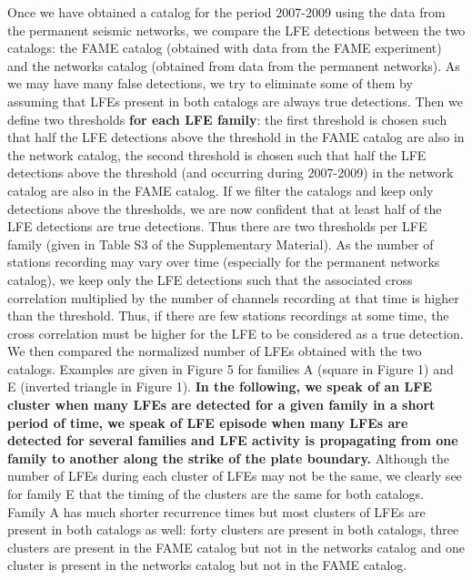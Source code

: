 \documentclass[draft]{agujournal2019}
\begin{document}
Once we have obtained a catalog for the period 2007-2009 using the data from the permanent seismic networks, we compare the LFE detections between the two catalogs: the FAME catalog (obtained with data from the FAME experiment) and the networks catalog (obtained from data from the permanent networks). As we may have many false detections, we try to eliminate some of them by assuming that LFEs present in both catalogs are always true detections. Then we define two thresholds \textbf{for each LFE family}: the first threshold is chosen such that half the LFE detections above the threshold in the FAME catalog are also in the network catalog, the second threshold is chosen such that half the LFE detections above the threshold (and occurring during 2007-2009) in the network catalog are also in the FAME catalog. If we filter the catalogs and keep only detections above the thresholds, we are now confident that at least half of the LFE detections are true detections. Thus there are two thresholds per LFE family (given in Table S3 of the Supplementary Material). As the number of stations recording may vary over time (especially for the permanent networks catalog), we keep only the LFE detections such that the associated cross correlation multiplied by the number of channels recording at that time is higher than the threshold. Thus, if there are few stations recordings at some time, the cross correlation must be higher for the LFE to be considered as a true detection. We then compared the normalized number of LFEs obtained with the two catalogs. Examples are given in Figure 5 for families A (square in Figure 1) and E (inverted triangle in Figure 1). \textbf{In the following, we speak of an LFE cluster when many LFEs are detected for a given family in a short period of time, we speak of LFE episode when many LFEs are detected for several families and LFE activity is propagating from one family to another along the strike of the plate boundary.} Although the number of LFEs during each cluster of LFEs may not be the same, we clearly see for family E that the timing of the clusters are the same for both catalogs. Family A has much shorter recurrence times but most clusters of LFEs are present in both catalogs as well: forty clusters are present in both catalogs, three clusters are present in the FAME catalog but not in the networks catalog and one cluster is present in the networks catalog but not in the FAME catalog. \\
\end{document}
